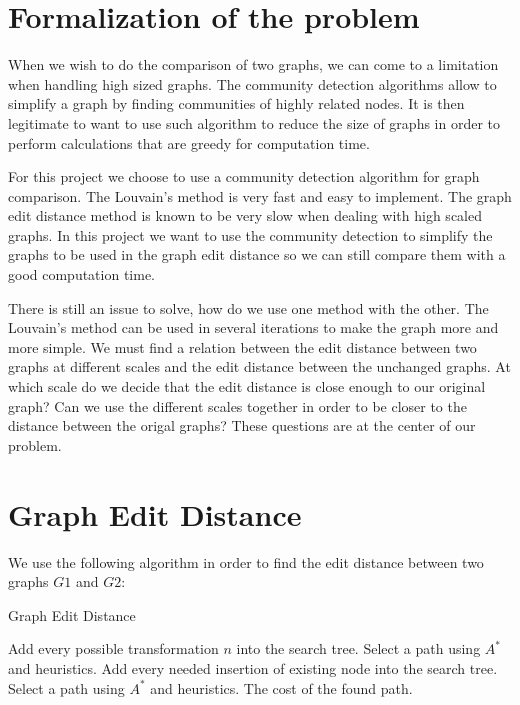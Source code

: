 \documentclass[UTF8, twoside]{EPURapport}
\begin{document}
\chapter{Formalization of the problem}

	\hspace{4ex}When we wish to do the comparison of two graphs, we can come to a limitation when handling high sized graphs. The community detection algorithms allow to simplify a graph by finding communities of highly related nodes. It is then legitimate to want to use such algorithm to reduce the size of graphs in order to perform calculations that are greedy for computation time.
	
	For this project we choose to use a community detection algorithm for graph comparison. The Louvain's method is very fast and easy to implement. The graph edit distance method is known to be very slow when dealing with high scaled graphs. In this project we want to use the community detection to simplify the graphs to be used in the graph edit distance so we can still compare them with a good computation time.
	
	There is still an issue to solve, how do we use one method with the other. The Louvain's method can be used in several iterations to make the graph more and more simple. We must find a relation between the edit distance between two graphs at different scales and the edit distance between the unchanged graphs. At which scale do we decide that the edit distance is close enough to our original graph? Can we use the different scales together in order to be closer to the distance between the origal graphs? These questions are at the center of our problem.
	
\chapter{Graph Edit Distance}

	\hspace{4ex}We use the following algorithm in order to find the edit distance between two graphs $G1$ and $G2$:
	
\begin{algorithm}
  \caption{Graph Edit Distance}
  \begin{algorithmic}[1]
      \Repeat
		  \State Add every possible transformation $n$ into the search tree.
		  \State Select a path using $A^*$ and heuristics.
		\EndFor
		  \State Add every needed insertion of existing node into the search tree.
		  \State Select a path using $A^*$ and heuristics.
		\EndFor
	  \State \Return The cost of the found path.
  \end{algorithmic}
\end{algorithm}
\end{document}
